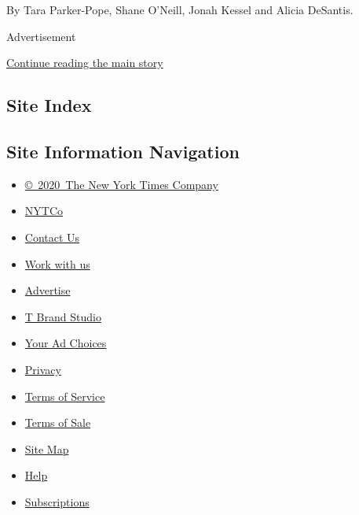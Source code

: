 By Tara Parker-Pope, Shane O'Neill, Jonah Kessel and Alicia DeSantis.

Advertisement

\protect\hyperlink{after-bottom}{Continue reading the main story}

\hypertarget{site-index}{%
\subsection{Site Index}\label{site-index}}

\hypertarget{site-information-navigation}{%
\subsection{Site Information
Navigation}\label{site-information-navigation}}

\begin{itemize}
\tightlist
\item
  \href{https://help.nytimes3xbfgragh.onion/hc/en-us/articles/115014792127-Copyright-notice}{©~2020~The
  New York Times Company}
\end{itemize}

\begin{itemize}
\tightlist
\item
  \href{https://www.nytco.com/}{NYTCo}
\item
  \href{https://help.nytimes3xbfgragh.onion/hc/en-us/articles/115015385887-Contact-Us}{Contact
  Us}
\item
  \href{https://www.nytco.com/careers/}{Work with us}
\item
  \href{https://nytmediakit.com/}{Advertise}
\item
  \href{http://www.tbrandstudio.com/}{T Brand Studio}
\item
  \href{https://www.nytimes3xbfgragh.onion/privacy/cookie-policy\#how-do-i-manage-trackers}{Your
  Ad Choices}
\item
  \href{https://www.nytimes3xbfgragh.onion/privacy}{Privacy}
\item
  \href{https://help.nytimes3xbfgragh.onion/hc/en-us/articles/115014893428-Terms-of-service}{Terms
  of Service}
\item
  \href{https://help.nytimes3xbfgragh.onion/hc/en-us/articles/115014893968-Terms-of-sale}{Terms
  of Sale}
\item
  \href{https://spiderbites.nytimes3xbfgragh.onion}{Site Map}
\item
  \href{https://help.nytimes3xbfgragh.onion/hc/en-us}{Help}
\item
  \href{https://www.nytimes3xbfgragh.onion/subscription?campaignId=37WXW}{Subscriptions}
\end{itemize}
